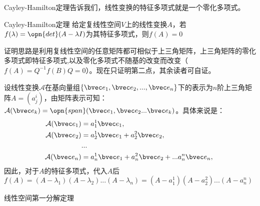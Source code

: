 Cayley-Hamilton定理告诉我们，线性变换的特征多项式就是一个零化多项式。
\begin{theorem}{Cayley-Hamilton定理}
给定复线性空间$V$上的线性变换$A$，若$f(\lambda)=\opn{det}(A-\lambda I)$为其特征多项式，则$f(A)=0$
\end{theorem}
证明思路是利用复线性空间的任意矩阵都可相似于上三角矩阵，上三角矩阵的零化多项式即特征多项式,以及零化多项式不随基的改变而改变（$f(A)=Q^{-1}f(B)Q=0$）。现在只证明第二点，其余读者可自证。

设线性变换$\mathcal A$在基向量组$\{\bvec e_1,\bvec e_2,...,\bvec e_n\}$下的表示为$n$阶上三角矩阵$A=(a^i_j)$，由矩阵表示可知：$\mathcal A(\bvec e_k)=\opn{span}(\bvec e_1,\bvec e_2...\bvec e_k)$。具体来说是：
\begin{equation}
\begin{aligned}
\mathcal A(\bvec e_1)&=a^1_1 \bvec e_1,\\
\mathcal A(\bvec e_2)&=a^1_2 \bvec e_1+a^2_2\bvec e_2,\\
&...\\
\mathcal A(\bvec e_n)&=a^1_n \bvec e_1+a^2_n\bvec e_2+...a^n_n\bvec e_n,\\
\end{aligned}~
\end{equation}
因此，对于$A$的特征多项式，代入$A$后$f(A)=(A-\lambda_1)(A-\lambda_2)...(A-\lambda_n)=(A-a^1_1)(A-a^2_2)...(A-a^n_n)$
\begin{theorem}{线性空间第一分解定理}

\end{theorem}